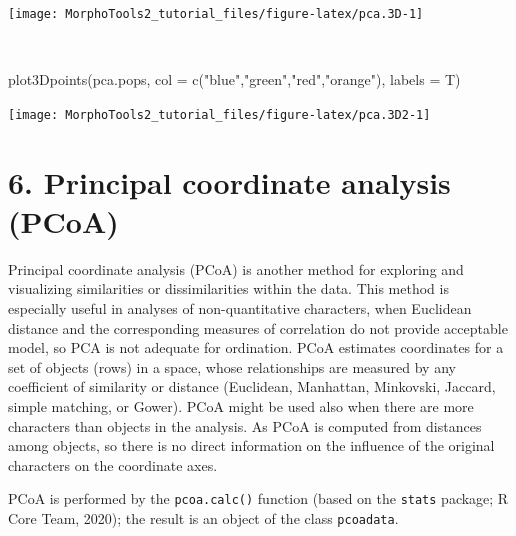 \documentclass[
  11pt,
  a4paper]{article}
\newenvironment{Shaded}{\begin{snugshade}}{\end{snugshade}}
\newcommand{\AttributeTok}[1]{\textcolor[rgb]{0.77,0.63,0.00}{#1}}
\newcommand{\FunctionTok}[1]{\textcolor[rgb]{0.00,0.00,0.00}{#1}}
\newcommand{\NormalTok}[1]{#1}
\newcommand{\StringTok}[1]{\textcolor[rgb]{0.31,0.60,0.02}{#1}}
\begin{document}
\begin{center}\texttt{[image: MorphoTools2\_tutorial\_files/figure-latex/pca.3D-1]} \end{center}

~\\
\hspace*{0.333em}

\begin{Shaded}
\begin{Highlighting}[]
\FunctionTok{plot3Dpoints}\NormalTok{(pca.pops, }\AttributeTok{col =} \FunctionTok{c}\NormalTok{(}\StringTok{"blue"}\NormalTok{,}\StringTok{"green"}\NormalTok{,}\StringTok{"red"}\NormalTok{,}\StringTok{"orange"}\NormalTok{), }\AttributeTok{labels =}\NormalTok{ T)}
\end{Highlighting}
\end{Shaded}

\begin{center}\texttt{[image: MorphoTools2\_tutorial\_files/figure-latex/pca.3D2-1]} \end{center}

\newpage

\hypertarget{principal-coordinate-analysis-pcoa}{%
\section{6. Principal coordinate analysis
(PCoA)}\label{principal-coordinate-analysis-pcoa}}

Principal coordinate analysis (PCoA) is another method for exploring and
visualizing similarities or dissimilarities within the data. This method
is especially useful in analyses of non-quantitative characters, when
Euclidean distance and the corresponding measures of correlation do not
provide acceptable model, so PCA is not adequate for ordination. PCoA
estimates coordinates for a set of objects (rows) in a space, whose
relationships are measured by any coefficient of similarity or distance
(Euclidean, Manhattan, Minkovski, Jaccard, simple matching, or Gower).
PCoA might be used also when there are more characters than objects in
the analysis. As PCoA is computed from distances among objects, so there
is no direct information on the influence of the original characters on
the coordinate axes.

PCoA is performed by the \texttt{pcoa.calc()} function (based on the
\texttt{stats} package; R Core Team, 2020); the result is an object of
the class \texttt{pcoadata}.
\end{document}
